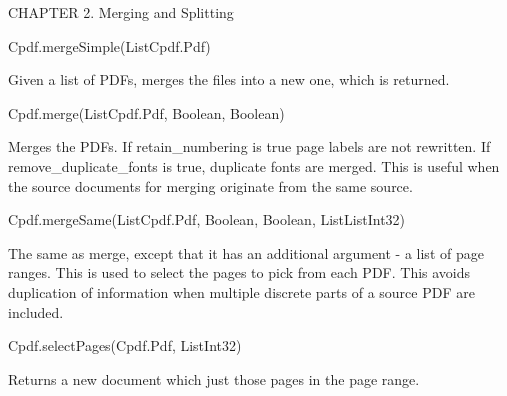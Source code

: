 CHAPTER 2. Merging and Splitting

Cpdf.mergeSimple(List{Cpdf.Pdf})

Given a list of PDFs, merges the files into a new one, which is returned.

Cpdf.merge(List{Cpdf.Pdf}, Boolean, Boolean)

Merges the PDFs. If retain_numbering is true page labels are not rewritten. If
remove_duplicate_fonts is true, duplicate fonts are merged. This is useful when
the source documents for merging originate from the same source.

Cpdf.mergeSame(List{Cpdf.Pdf}, Boolean, Boolean, List{List{Int32}})

The same as merge, except that it has an additional argument - a list of page
ranges. This is used to select the pages to pick from each PDF. This avoids
duplication of information when multiple discrete parts of a source PDF are
included.

Cpdf.selectPages(Cpdf.Pdf, List{Int32})

Returns a new document which just those pages in the page range.
